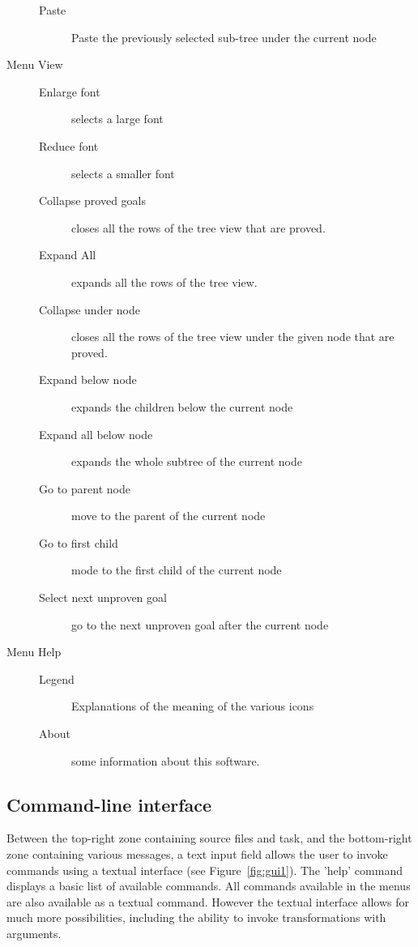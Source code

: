\begin{description}
\begin{description}
\item[Paste] Paste the previously selected sub-tree under the current node

\end{description}

\item[Menu \textsf{View}]\emptyitem
\begin{description}
\item[Enlarge font] selects a large font
\item[Reduce font] selects a smaller font
\item[Collapse proved goals] closes all the rows of the tree view
  that are proved.
\item[Expand All] expands all the rows of the tree view.
\item[Collapse under node] closes all the rows of the tree view under the given node
  that are proved.
\item[Expand below node] expands the children below the current node
\item[Expand all below node] expands the whole subtree of the current node
\item[Go to parent node] move to the parent of the current node
\item[Go to first child] mode to the first child of the current node
\item[Select next unproven goal] go to the next unproven goal after the current node
\end{description}


\item[Menu \textsf{Help}]\emptyitem
\begin{description}
\item[Legend]
Explanations of the meaning of the various icons
\item[About]
some information about this software.
\end{description}

\end{description}

\subsection{Command-line interface}

Between the top-right zone containing source files and task, and the
bottom-right zone containing various messages, a text input field
allows the user to invoke commands using a textual interface (see
Figure~\ref{fig:gui1}). The 'help' command displays a basic list of
available commands. All commands available in the menus are also
available as a textual command. However the textual interface allows
for much more possibilities, including the ability to invoke
transformations with arguments.

